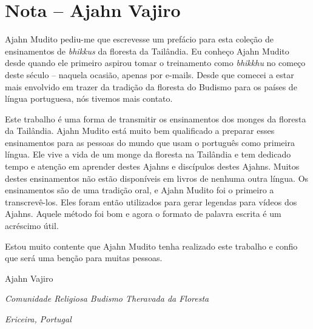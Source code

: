 
\chapter{Nota – Ajahn Vajiro}

Ajahn Mudito pediu-me que escrevesse um prefácio para esta coleção
de ensinamentos de \textit{bhikkus} da floresta da Tailândia. Eu
conheço Ajahn Mudito desde quando ele primeiro aspirou tomar o
treinamento como \textit{bhikkhu} no começo deste século – naquela
ocasião, apenas por e-mails. Desde que comecei a estar mais envolvido
em trazer da tradição da floresta do Budismo para os países de língua
portuguesa, nós tivemos mais contato.

Este trabalho é uma forma de transmitir os ensinamentos dos monges
da floresta da Tailândia. Ajahn Mudito está muito bem qualificado a
preparar esses ensinamentos para as pessoas do mundo que usam o
português como primeira língua. Ele vive a vida de um monge da floresta
na Tailândia e tem dedicado tempo e atenção em aprender destes Ajahns e
discípulos destes Ajahns. Muitos destes ensinamentos não estão
disponíveis em livros de nenhuma outra língua. Os ensinamentos são de
uma tradição oral, e Ajahn Mudito foi o primeiro a transcrevê-los. Eles
foram então utilizados para gerar legendas para vídeos dos Ajahns.
Aquele método foi bom e agora o formato de palavra escrita é um
acréscimo útil.

Estou muito contente que Ajahn Mudito tenha realizado este trabalho
e confio que será uma benção para muitas pessoas.

Ajahn Vajiro

{\itshape
Comunidade Religiosa Budismo Theravada da Floresta}

{\itshape
Ericeira, Portugal}

